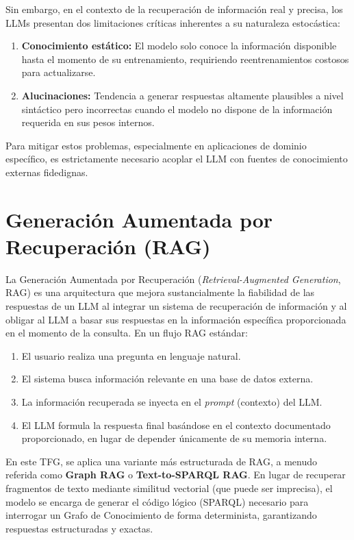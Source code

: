 Sin embargo, en el contexto de la recuperación de información real y precisa, los LLMs presentan dos limitaciones críticas inherentes a su naturaleza estocástica:
\begin{enumerate}
    \item \textbf{Conocimiento estático:} El modelo solo conoce la información disponible hasta el momento de su entrenamiento, requiriendo reentrenamientos costosos para actualizarse.
    \item \textbf{Alucinaciones:} Tendencia a generar respuestas altamente plausibles a nivel sintáctico pero incorrectas cuando el modelo no dispone de la información requerida en sus pesos internos.
\end{enumerate}

Para mitigar estos problemas, especialmente en aplicaciones de dominio específico, es estrictamente necesario acoplar el LLM con fuentes de conocimiento externas fidedignas.

\section{Generación Aumentada por Recuperación (RAG)}

La Generación Aumentada por Recuperación (\textit{Retrieval-Augmented Generation}, RAG) es una arquitectura \cite{lewis2020retrieval} que mejora sustancialmente la fiabilidad de las respuestas de un LLM al integrar un sistema de recuperación de información y al obligar al LLM a basar sus respuestas en la información específica proporcionada en el momento de la consulta. En un flujo RAG estándar:
\begin{enumerate}
    \item El usuario realiza una pregunta en lenguaje natural.
    \item El sistema busca información relevante en una base de datos externa.
    \item La información recuperada se inyecta en el \textit{prompt} (contexto) del LLM.
    \item El LLM formula la respuesta final basándose en el contexto documentado proporcionado, en lugar de depender únicamente de su memoria interna.
\end{enumerate}

En este TFG, se aplica una variante más estructurada de RAG, a menudo referida como \textbf{Graph RAG} o \textbf{Text-to-SPARQL RAG}. En lugar de recuperar fragmentos de texto mediante similitud vectorial (que puede ser imprecisa), el modelo se encarga de generar el código lógico (SPARQL) necesario para interrogar un Grafo de Conocimiento de forma determinista, garantizando respuestas estructuradas y exactas.

